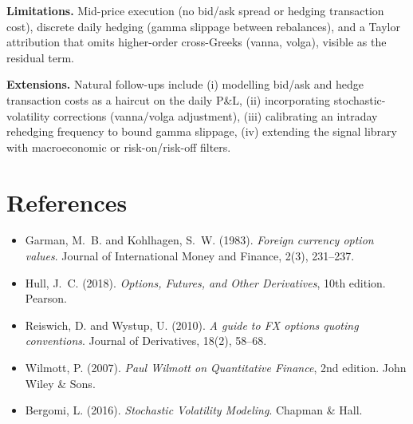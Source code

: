 \documentclass[11pt, a4paper]{article}
\theoremstyle{defstyle}
\begin{document}
\medskip
\textbf{Limitations.}
Mid-price execution (no bid/ask spread or hedging transaction cost), discrete daily
hedging (gamma slippage between rebalances), and a Taylor attribution that omits
higher-order cross-Greeks (vanna, volga), visible as the residual term.

\medskip
\textbf{Extensions.}
Natural follow-ups include
(i) modelling bid/ask and hedge transaction costs as a haircut on the daily P\&L,
(ii) incorporating stochastic-volatility corrections (vanna/volga adjustment),
(iii) calibrating an intraday rehedging frequency to bound gamma slippage,
(iv) extending the signal library with macroeconomic or risk-on/risk-off filters.

\section*{References}

\begin{itemize}
    \item Garman, M.~B. and Kohlhagen, S.~W. (1983).
          \emph{Foreign currency option values}. Journal of International Money
          and Finance, 2(3), 231--237.
    \item Hull, J.~C. (2018). \emph{Options, Futures, and Other Derivatives},
          10th edition. Pearson.
    \item Reiswich, D. and Wystup, U. (2010).
          \emph{A guide to FX options quoting conventions}. Journal of Derivatives,
          18(2), 58--68.
    \item Wilmott, P. (2007). \emph{Paul Wilmott on Quantitative Finance},
          2nd edition. John Wiley \& Sons.
    \item Bergomi, L. (2016). \emph{Stochastic Volatility Modeling}. Chapman \& Hall.
\end{itemize}

\end{document}
